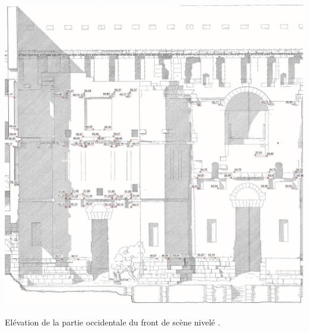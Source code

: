\begin{figureth}
	\includegraphics[width=\linewidth]{images/frontdescene}
	\caption[Elévation du front de scène.]{Elévation de la partie occidentale du front de scène nivelé \cite[Pl. XXIX]{orangePl}.}
	\label{frontdescene} 
\end{figureth}
	
